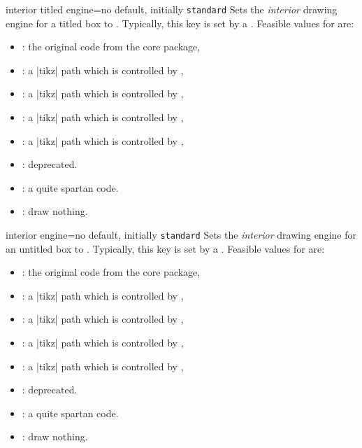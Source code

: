 \begin{docTcbKey}{interior titled engine}{=}{no default, initially \texttt{standard}}
  Sets the \emph{interior} drawing engine for a titled box to .
  Typically, this key is set by a .
  Feasible values for  are:
  \begin{itemize}
  \item{}: the original code from the core package,
  \item{}: a |tikz| path which is controlled by ,
  \item{}: a |tikz| path which is controlled by ,
  \item{}: a |tikz| path which is controlled by ,
  \item{}: a |tikz| path which is controlled by ,
  \item{}: deprecated.
  \item{}: a quite spartan code.
  \item{}: draw nothing.
  \end{itemize}
\end{docTcbKey}

\clearpage
\begin{docTcbKey}{interior engine}{=}{no default, initially \texttt{standard}}
  Sets the \emph{interior} drawing engine for an untitled box to .
  Typically, this key is set by a .
  Feasible values for  are:
  \begin{itemize}
  \item{}: the original code from the core package,
  \item{}: a |tikz| path which is controlled by ,
  \item{}: a |tikz| path which is controlled by ,
  \item{}: a |tikz| path which is controlled by ,
  \item{}: a |tikz| path which is controlled by ,
  \item{}: deprecated.
  \item{}: a quite spartan code.
  \item{}: draw nothing.
  \end{itemize}
\end{docTcbKey}

